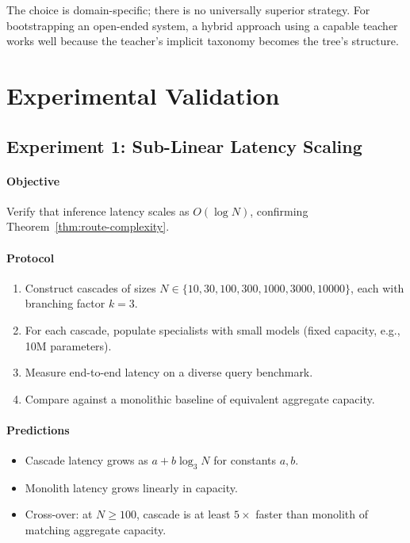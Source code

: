 \documentclass[11pt,twocolumn,a4paper]{article}
\theoremstyle{definition}
\theoremstyle{remark}
\begin{document}
The choice is domain-specific; there is no universally superior strategy. For bootstrapping an open-ended system, a hybrid approach using a capable teacher works well because the teacher's implicit taxonomy becomes the tree's structure.

\section{Experimental Validation}
\label{sec:validation}

\subsection{Experiment 1: Sub-Linear Latency Scaling}

\paragraph{Objective} Verify that inference latency scales as $O(\log N)$, confirming Theorem~\ref{thm:route-complexity}.

\paragraph{Protocol}
\begin{enumerate}
    \item Construct cascades of sizes $N \in \{10, 30, 100, 300, 1000, 3000, 10000\}$, each with branching factor $k = 3$.
    \item For each cascade, populate specialists with small models (fixed capacity, e.g., 10M parameters).
    \item Measure end-to-end latency on a diverse query benchmark.
    \item Compare against a monolithic baseline of equivalent aggregate capacity.
\end{enumerate}

\paragraph{Predictions}
\begin{itemize}
    \item Cascade latency grows as $a + b \log_3 N$ for constants $a, b$.
    \item Monolith latency grows linearly in capacity.
    \item Cross-over: at $N \geq 100$, cascade is at least $5\times$ faster than monolith of matching aggregate capacity.
\end{itemize}
\end{document}
